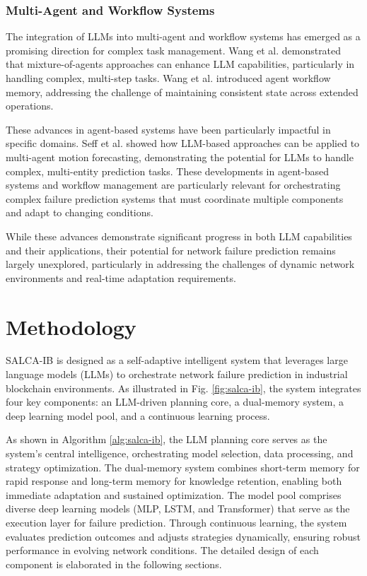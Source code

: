 \documentclass[conference]{IEEEtran}
\begin{document}
\subsubsection{Multi-Agent and Workflow Systems}
The integration of LLMs into multi-agent and workflow systems has emerged as a promising direction for complex task management. Wang et al. \cite{wang2024} demonstrated that mixture-of-agents approaches can enhance LLM capabilities, particularly in handling complex, multi-step tasks. Wang et al. \cite{wang2024agent} introduced agent workflow memory, addressing the challenge of maintaining consistent state across extended operations.

These advances in agent-based systems have been particularly impactful in specific domains. Seff et al. \cite{seff2023} showed how LLM-based approaches can be applied to multi-agent motion forecasting, demonstrating the potential for LLMs to handle complex, multi-entity prediction tasks. These developments in agent-based systems and workflow management are particularly relevant for orchestrating complex failure prediction systems that must coordinate multiple components and adapt to changing conditions.

While these advances demonstrate significant progress in both LLM capabilities and their applications, their potential for network failure prediction remains largely unexplored, particularly in addressing the challenges of dynamic network environments and real-time adaptation requirements.

\section{Methodology}

SALCA-IB is designed as a self-adaptive intelligent system that leverages large language models (LLMs) to orchestrate network failure prediction in industrial blockchain environments. As illustrated in Fig. \ref{fig:salca-ib}, the system integrates four key components: an LLM-driven planning core, a dual-memory system, a deep learning model pool, and a continuous learning process.

As shown in Algorithm \ref{alg:salca-ib}, the LLM planning core serves as the system's central intelligence, orchestrating model selection, data processing, and strategy optimization. The dual-memory system combines short-term memory for rapid response and long-term memory for knowledge retention, enabling both immediate adaptation and sustained optimization. The model pool comprises diverse deep learning models (MLP, LSTM, and Transformer) that serve as the execution layer for failure prediction. Through continuous learning, the system evaluates prediction outcomes and adjusts strategies dynamically, ensuring robust performance in evolving network conditions. The detailed design of each component is elaborated in the following sections.
\end{document}
